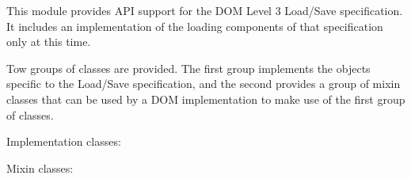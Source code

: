 \documentclass{howto}
\begin{document}
This module provides API support for the DOM Level 3 Load/Save
specification.  It includes an implementation of the loading
components of that specification only at this time.

Tow groups of classes are provided.  The first group implements the
objects specific to the Load/Save specification, and the second
provides a group of mixin classes that can be used by a DOM
implementation to make use of the first group of classes.

Implementation classes:


Mixin classes:




\end{document}
